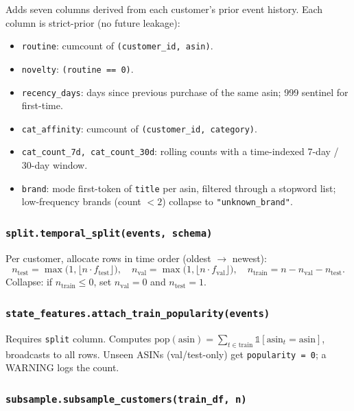 \documentclass[11pt,a4paper]{article}
\begin{document}
Adds seven columns derived from each customer's prior event history.
Each column is strict-prior (no future leakage):
\begin{itemize}
\item[$\triangleright$] \texttt{routine}: cumcount of
\texttt{(customer\_id, asin)}.
\item[$\triangleright$] \texttt{novelty}: \texttt{(routine == 0)}.
\item[$\triangleright$] \texttt{recency\_days}: days since previous purchase of
the same asin; 999 sentinel for first-time.
\item[$\triangleright$] \texttt{cat\_affinity}: cumcount of
\texttt{(customer\_id, category)}.
\item[$\triangleright$] \texttt{cat\_count\_7d, cat\_count\_30d}: rolling
counts with a time-indexed 7-day / 30-day window.
\item[$\triangleright$] \texttt{brand}: mode first-token of \texttt{title} per
asin, filtered through a stopword list; low-frequency brands
(count $<2$) collapse to \texttt{"unknown\_brand"}.
\end{itemize}

\subsubsection*{\texttt{split.temporal\_split(events, schema)}}

Per customer, allocate rows in time order (oldest $\to$ newest):
\[
n_{\text{test}} = \max\!\bigl(1, \lfloor n \cdot f_{\text{test}} \rfloor\bigr),
\quad
n_{\text{val}} = \max\!\bigl(1, \lfloor n \cdot f_{\text{val}} \rfloor\bigr),
\quad
n_{\text{train}} = n - n_{\text{val}} - n_{\text{test}}.
\]
Collapse: if $n_{\text{train}} \le 0$, set $n_{\text{val}} = 0$ and
$n_{\text{test}} = 1$.

\subsubsection*{\texttt{state\_features.attach\_train\_popularity(events)}}

Requires \texttt{split} column. Computes
$\text{pop}(\text{asin}) = \sum_{t \in \text{train}} \mathbb{1}[\text{asin}_t = \text{asin}]$,
broadcasts to all rows. Unseen ASINs (val/test-only) get
\texttt{popularity = 0}; a WARNING logs the count.

\subsubsection*{\texttt{subsample.subsample\_customers(train\_df, n)}}
\end{document}
